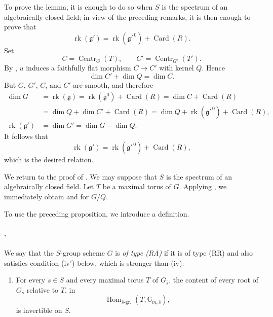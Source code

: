To prove the lemma, it is enough to do so when \(S\) is the
spectrum of an algebraically closed field; in view of the preceding
remarks, it is then enough to prove that
\[
  \operatorname{rk}(\mathfrak g')
  =
  \operatorname{rk}(\mathfrak g'^{\,0})
  +
  \operatorname{Card}(R).
\]
Set
\[
  C=\operatorname{Centr}_G(T),
  \qquad
  C'=\operatorname{Centr}_{G'}(T').
\]
By  \textup{}, \(u\) induces a faithfully flat
morphism \(C\to C'\) with kernel \(Q\). Hence
\[
  \dim C'+\dim Q=\dim C.
\]
But \(G\), \(G'\), \(C\), and \(C'\) are smooth, and therefore
\[
\begin{aligned}
  \dim G
  &=
  \operatorname{rk}(\mathfrak g)
   =
  \operatorname{rk}(\mathfrak g^0)+\operatorname{Card}(R)
   =
  \dim C+\operatorname{Card}(R)
  \\
  &=
  \dim Q+\dim C'+\operatorname{Card}(R)
   =
  \dim Q+\operatorname{rk}(\mathfrak g'^{\,0})
  +\operatorname{Card}(R),
  \\
  \operatorname{rk}(\mathfrak g')
  &=
  \dim G'
   =
  \dim G-\dim Q.
\end{aligned}
\]
It follows that
\[
  \operatorname{rk}(\mathfrak g')
  =
  \operatorname{rk}(\mathfrak g'^{\,0})
  +
  \operatorname{Card}(R),
\]
which is the desired relation.

We return to the proof of . We may suppose that \(S\) is the
spectrum of an algebraically closed field. Let \(T\) be a maximal
torus of \(G\). Applying , we immediately obtain
\textup{} and \textup{} for \(G/Q\).

To use the preceding proposition, we introduce a definition.

\paragraph{.}
We say that the \(S\)-group scheme \(G\) is \emph{of type
\textup{(RA)}} if it is of type \textup{(RR)} and also satisfies
condition \textup{(iv$'$)} below, which is stronger than
\textup{(iv)}:
\begin{enumerate}
\item[\textup{(iv$'$)}]
For every \(s\in S\) and every maximal torus \(T\) of
\(G_{\bar s}\), the content of every root of \(G_{\bar s}\)
relative to \(T\), in
\[
  \operatorname{Hom}_{\bar s\text{-gr.}}
    (T,\mathbb G_{m,\bar s}),
\]
is invertible on \(S\).
\end{enumerate}


